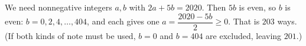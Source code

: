 We need nonnegative integers $a,b$ with $2a+5b=2020$. Then $5b$ is even, so $b$ is even: $b=0,2,4,\dots,404$, and each gives one $a=\dfrac{2020-5b}{2}\ge0$. That is $\boxed{203}$ ways. (If both kinds of note must be used, $b=0$ and $b=404$ are excluded, leaving $201$.)
